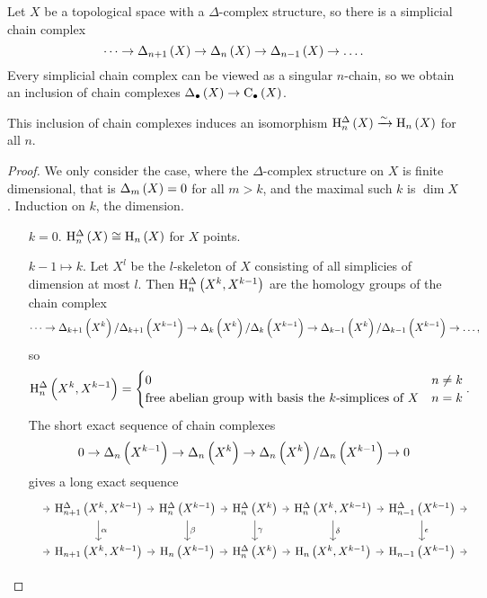 \pagebreak

Let $ X $ be a topological space with a $ \Delta $-complex structure, so there is a simplicial chain complex
$$ \dots \to \Delta_{n + 1}\br{X} \to \Delta_n\br{X} \to \Delta_{n - 1}\br{X} \to \dots. $$
Every simplicial chain complex can be viewed as a singular $ n $-chain, so we obtain an inclusion of chain complexes $ \Delta_\bullet\br{X} \to \C_\bullet\br{X} $.

\begin{theorem}
This inclusion of chain complexes induces an isomorphism $ \H_n^\Delta\br{X} \xrightarrow{\sim} \H_n\br{X} $ for all $ n $.
\end{theorem}

\begin{proof}
We only consider the case, where the $ \Delta $-complex structure on $ X $ is finite dimensional, that is $ \Delta_m\br{X} = 0 $ for all $ m > k $, and the maximal such $ k $ is $ \dim X $. Induction on $ k $, the dimension.
\begin{itemize}[leftmargin=2cm]
\item[$ k = 0 $.] $ \H_n^\Delta\br{X} \cong \H_n\br{X} $ for $ X $ points.
\item[$ k - 1 \mapsto k $.] Let $ X^l $ be the $ l $-skeleton of $ X $ consisting of all simplicies of dimension at most $ l $. Then $ \H_n^\Delta\br{X^k, X^{k - 1}} $ are the homology groups of the chain complex
$$ \dots \to \Delta_{k + 1}\br{X^k} / \Delta_{k + 1}\br{X^{k - 1}} \to \Delta_k\br{X^k} / \Delta_k\br{X^{k - 1}} \to \Delta_{k - 1}\br{X^k} / \Delta_{k - 1}\br{X^{k - 1}} \to \dots, $$
so
$$ \H_n^\Delta\br{X^k, X^{k - 1}} =
\begin{cases}
0 & n \ne k \\
\text{free abelian group with basis the $ k $-simplices of} \ X & n = k
\end{cases}.
$$
The short exact sequence of chain complexes
$$ 0 \to \Delta_n\br{X^{k - 1}} \to \Delta_n\br{X^k} \to \Delta_n\br{X^k} / \Delta_n\br{X^{k - 1}} \to 0 $$
gives a long exact sequence
$$
\begin{tikzcd}[column sep=tiny]
\ \arrow{r} & \H_{n + 1}^\Delta\br{X^k, X^{k - 1}} \arrow{r} \arrow{d}{\alpha} & \H_n^\Delta\br{X^{k - 1}} \arrow{r} \arrow{d}{\beta} & \H_n^\Delta\br{X^k} \arrow{r} \arrow{d}{\gamma} & \H_n^\Delta\br{X^k, X^{k - 1}} \arrow{r} \arrow{d}{\delta} & \H_{n - 1}^\Delta\br{X^{k - 1}} \arrow{d}{\epsilon} \arrow{r} & \ \\
\ \arrow{r} & \H_{n + 1}\br{X^k, X^{k - 1}} \arrow{r} & \H_n\br{X^{k - 1}} \arrow{r} & \H_n^\Delta\br{X^k} \arrow{r} & \H_n\br{X^k, X^{k - 1}} \arrow{r} & \H_{n - 1}\br{X^{k - 1}} \arrow{r} & \

\end{tikzcd}$$
\end{itemize}
\end{proof}
